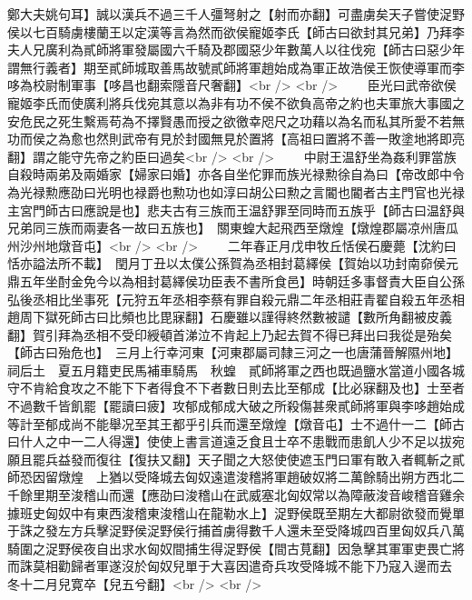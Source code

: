 鄭大夫姚句耳】誠以漢兵不過三千人彊弩射之【射而亦翻】可盡虜矣天子嘗使浞野侯以七百騎虜樓蘭王以定漢等言為然而欲侯寵姬李氏【師古曰欲封其兄弟】乃拜李夫人兄廣利為貳師將軍發屬國六千騎及郡國惡少年數萬人以往伐宛【師古曰惡少年謂無行義者】期至貳師城取善馬故號貳師將軍趙始成為軍正故浩侯王恢使導軍而李哆為校尉制軍事【哆昌也翻索隱音尺奢翻】<br />
<br />
　　臣光曰武帝欲侯寵姬李氏而使廣利將兵伐宛其意以為非有功不侯不欲負高帝之約也夫軍旅大事國之安危民之死生繫焉苟為不擇賢愚而授之欲徼幸咫尺之功藉以為名而私其所愛不若無功而侯之為愈也然則武帝有見於封國無見於置將【高祖曰置將不善一敗塗地將即亮翻】謂之能守先帝之約臣曰過矣<br />
<br />
　　中尉王温舒坐為姦利罪當族自殺時兩弟及兩婚家【婦家曰婚】亦各自坐佗罪而族光禄勲徐自為曰【帝改郎中令為光禄勲應劭曰光明也禄爵也勲功也如淳曰胡公曰勲之言閽也閽者古主門官也光禄主宮門師古曰應說是也】悲夫古有三族而王温舒罪至同時而五族乎【師古曰温舒與兄弟同三族而兩妻各一故曰五族也】　關東蝗大起飛西至燉煌【燉煌郡屬凉州唐瓜州沙州地燉音屯】<br />
<br />
　　二年春正月戊申牧丘恬侯石慶薨【沈約曰恬亦謚法所不載】　閏月丁丑以太僕公孫賀為丞相封葛繹侯【賀始以功封南奅侯元鼎五年坐酎金免今以為相封葛繹侯功臣表不書所食邑】時朝廷多事督責大臣自公孫弘後丞相比坐事死【元狩五年丞相李蔡有罪自殺元鼎二年丞相莊青翟自殺五年丞相趙周下獄死師古曰比頻也比毘寐翻】石慶雖以謹得終然數被譴【數所角翻被皮義翻】賀引拜為丞相不受印綬頓首涕泣不肯起上乃起去賀不得已拜出曰我從是殆矣【師古曰殆危也】　三月上行幸河東【河東郡屬司隸三河之一也唐蒲晉解隰州地】祠后土　夏五月籍吏民馬補車騎馬　秋蝗　貳師將軍之西也既過鹽水當道小國各城守不肯給食攻之不能下下者得食不下者數日則去比至郁成【比必寐翻及也】士至者不過數千皆飢罷【罷讀曰疲】攻郁成郁成大破之所殺傷甚衆貳師將軍與李哆趙始成等計至郁成尚不能舉况至其王都乎引兵而還至燉煌【燉音屯】士不過什一二【師古曰什人之中一二人得還】使使上書言道遠乏食且士卒不患戰而患飢人少不足以拔宛願且罷兵益發而復往【復扶又翻】天子聞之大怒使使遮玉門曰軍有敢入者輒斬之貳師恐因留燉煌　上猶以受降城去匈奴遠遣浚稽將軍趙破奴將二萬餘騎出朔方西北二千餘里期至浚稽山而還【應劭曰浚稽山在武威塞北匈奴常以為障蔽浚音峻稽音雞余據班史匈奴中有東西浚稽東浚稽山在龍勒水上】浞野侯既至期左大都尉欲發而覺單于誅之發左方兵擊浞野侯浞野侯行捕首虜得數千人還未至受降城四百里匈奴兵八萬騎圍之浞野侯夜自出求水匈奴間捕生得浞野侯【間古莧翻】因急擊其軍軍吏畏亡將而誅莫相勸歸者軍遂沒於匈奴兒單于大喜因遣奇兵攻受降城不能下乃寇入邊而去　冬十二月兒寛卒【兒五兮翻】<br />
<br />
